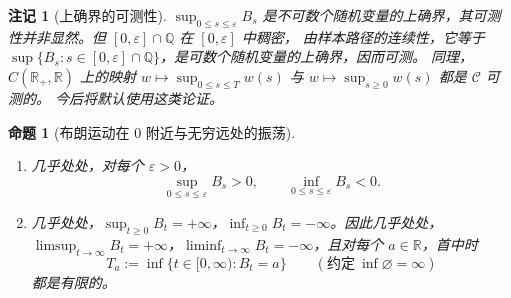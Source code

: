 \documentclass[UTF8,11pt,a4paper,oneside,fontset=fandol]{ctexrep}
\numberwithin{equation}{section}
\theoremstyle{zhthm}
\newtheorem{proposition}[theorem]{命题}
\newtheorem{remark}[theorem]{注记}
\newcommand{\Q}{\mathbb{Q}}
\newcommand{\R}{\mathbb{R}}
\begin{document}
\begin{remark}[上确界的可测性]
\label{rem:sup-measurability}
$\sup_{0\le s\le\varepsilon}B_s$ 是不可数个随机变量的上确界，其可测性并非显然。但 $[0,\varepsilon]\cap\Q$ 在 $[0,\varepsilon]$ 中稠密，
由样本路径的连续性，它等于 $\sup\{B_s:s\in[0,\varepsilon]\cap\Q\}$，是可数个随机变量的上确界，因而可测。
同理，$C(\R_+,\R)$ 上的映射 $w\mapsto\sup_{0\le s\le T}w(s)$ 与 $w\mapsto\sup_{s\ge0}w(s)$ 都是 $\mathscr C$ 可测的。
今后将默认使用这类论证。
\end{remark}

\begin{proposition}[布朗运动在 $0$ 附近与无穷远处的振荡]
\label{prop:brownian-oscillation}
\begin{enumerate}
  \item 几乎处处，对每个 $\varepsilon>0$，
    \[
      \sup_{0\le s\le\varepsilon}B_s>0,\qquad\inf_{0\le s\le\varepsilon}B_s<0.
    \]
  \item 几乎处处，$\sup_{t\ge0}B_t=+\infty$，$\inf_{t\ge0}B_t=-\infty$。因此几乎处处，
    $\limsup_{t\to\infty}B_t=+\infty$，$\liminf_{t\to\infty}B_t=-\infty$，且对每个 $a\in\R$，首中时
    \[
      T_a:=\inf\{t\in[0,\infty):B_t=a\}\qquad(\text{约定}\ \inf\varnothing=\infty)
    \]
    都是有限的。
\end{enumerate}
\end{proposition}
\end{document}
